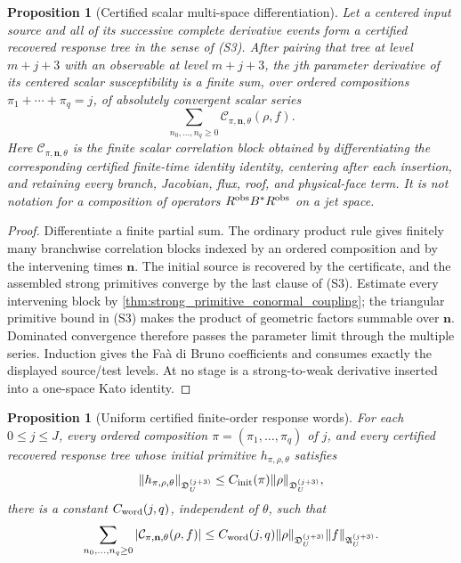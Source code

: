 \documentclass[11pt]{amsart}
\theoremstyle{compactplain}
\newtheorem{proposition}[theorem]{Proposition}
\theoremstyle{compactdefinition}
\theoremstyle{compactremark}
\begin{document}
\begin{proposition}[Certified scalar multi-space differentiation]
\label{prop:multispace_resolvent_differentiation}
Let a centered input source and all of its successive complete derivative
events form a certified recovered response tree in the sense of (S3).  After
pairing that tree at level \(m+j+3\) with an observable at level
\(m+j+3\), the \(j\)th parameter derivative of its centered scalar
susceptibility is a finite sum, over ordered compositions
\(\pi_1+\cdots+\pi_q=j\), of absolutely convergent scalar series
\begin{equation}
\label{eq:scale_kato_word}
  \sum_{n_0,\ldots,n_q\ge0}
    \mathcal C_{\pi,\mathbf n,\theta}(\rho,f).
\end{equation}
Here \(\mathcal C_{\pi,\mathbf n,\theta}\) is the finite scalar correlation
block obtained by differentiating the corresponding certified finite-time
identity
identity, centering after each insertion, and retaining every branch,
Jacobian, flux, roof, and physical-face term.  It is not notation for a
composition of operators \(R^{\rm obs}B^*R^{\rm obs}\) on a jet space.
\end{proposition}

\begin{proof}
Differentiate a finite partial sum.  The ordinary product rule gives finitely
many branchwise correlation blocks indexed by an ordered composition and by
the intervening times \(\mathbf n\).  The initial source is recovered by the
certificate, and the assembled strong primitives converge by the last clause
of (S3).  Estimate every intervening block by
\cref{thm:strong_primitive_conormal_coupling}; the triangular primitive bound
in (S3) makes the product of geometric factors summable over
\(\mathbf n\).  Dominated convergence therefore passes the parameter limit
through the multiple series.  Induction gives the Faà di Bruno coefficients
and consumes exactly the displayed source/test levels.  At no stage is a
strong-to-weak derivative inserted into a one-space Kato identity.
\end{proof}

\begin{proposition}[Uniform certified finite-order response words]
\label{prop:uniform_multiresponse_bounds}
For each \(0\le j\le J\), every ordered composition
\(\pi=(\pi_1,\ldots,\pi_q)\) of \(j\), and every certified recovered response
tree whose initial primitive \(h_{\pi,\rho,\theta}\) satisfies
\[
 \|h_{\pi,\rho,\theta}\|_{\mathfrak D_U^{(j+3)}}
 \le C_{\rm init}(\pi)\|\rho\|_{\mathfrak D_U^{(j+3)}},
\]
there is a constant
\(C_{\rm word}(j,q)\), independent of \(\theta\), such that
\begin{equation}
\label{eq:uniform_response_word_bound}
  \sum_{n_0,\ldots,n_q\ge0}
  |\mathcal C_{\pi,\mathbf n,\theta}(\rho,f)|
  \le
  C_{\rm word}(j,q)
  \|\rho\|_{\mathfrak D_U^{(j+3)}}
  \|f\|_{\mathfrak A_U^{(j+3)}} .
\end{equation}
\end{proposition}
\end{document}
